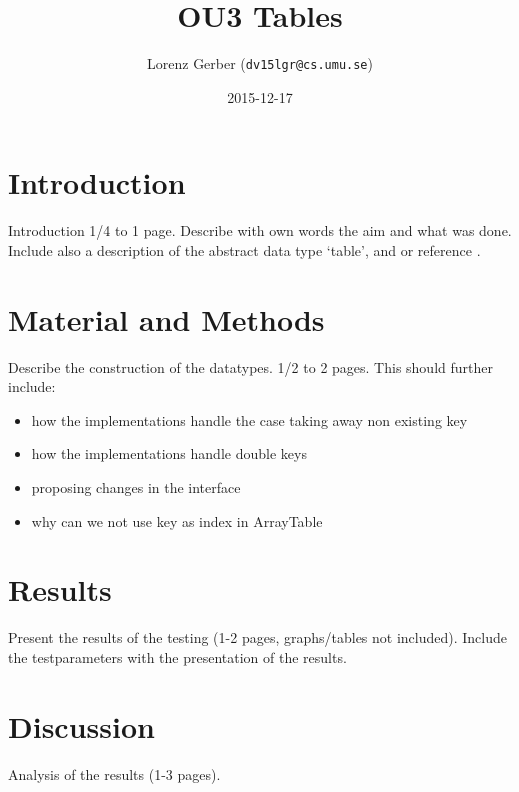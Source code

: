 \documentclass[a4paper,11pt,twoside]{article}
\title{OU3 Tables}
\author{Lorenz Gerber  ({\tt{dv15lgr@cs.umu.se}})}
\date{2015-12-17}
\begin{document}
\maketitle

\tableofcontents
\newpage

\section{Introduction} 
Introduction 1/4 to 1 page. Describe with own words the aim and what
was done. Include also a description of the abstract data type
`table', and or reference \cite[po. 117 -- 132]{janlert2000}.

\section{Material and Methods} 
Describe the construction of the datatypes. 1/2 to 2 pages. This
should further include:
\begin{itemize}
\item how the implementations handle the case taking away non existing
  key
\item how the implementations handle double keys
\item proposing changes in the interface
\item why can we not use key as index in ArrayTable
\end{itemize}


\section{Results}
Present the results of the testing (1-2 pages, graphs/tables not
included). Include the testparameters with the presentation of the
results.

\section{Discussion}
Analysis of the results (1-3 pages). 
\end{document}
